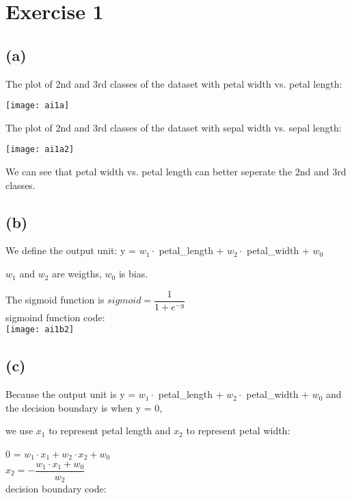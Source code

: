 \documentclass[11pt]{article}
\begin{document}
\section*{Exercise 1}

\subsection*{(a)}

The plot of 2nd and 3rd classes of the dataset with petal width vs. petal length:

\texttt{[image: ai1a]}

The plot of 2nd and 3rd classes of the dataset with sepal width vs. sepal length:

\texttt{[image: ai1a2]}

We can see that petal width vs. petal length can better seperate the 2nd and 3rd classes.

\subsection*{(b)}

We define the output unit: y = $w_1 \cdot$ petal\_length + $w_2 \cdot$ petal\_width + $w_0$

$w_1$ and $w_2$ are weigths, $w_0$ is bias.

The sigmoid function is $sigmoid = \dfrac{1}{1 + e^{-y}}$\\

sigmoind function code:\\

\texttt{[image: ai1b2]}

\subsection*{(c)}

Because the output unit is y = $w_1 \cdot$ petal\_length + $w_2 \cdot$ petal\_width + $w_0$ and the decision boundary is when y = 0, 

we use $x_1$ to represent petal length and $x_2$ to represent petal width: 

0 = $w_1 \cdot x_1 + w_2 \cdot x_2 + w_0$ \\

$x_2 = -\dfrac{w_1 \cdot x_1 + w_0}{w_2}$\\

decision boundary code:\\
\end{document}
